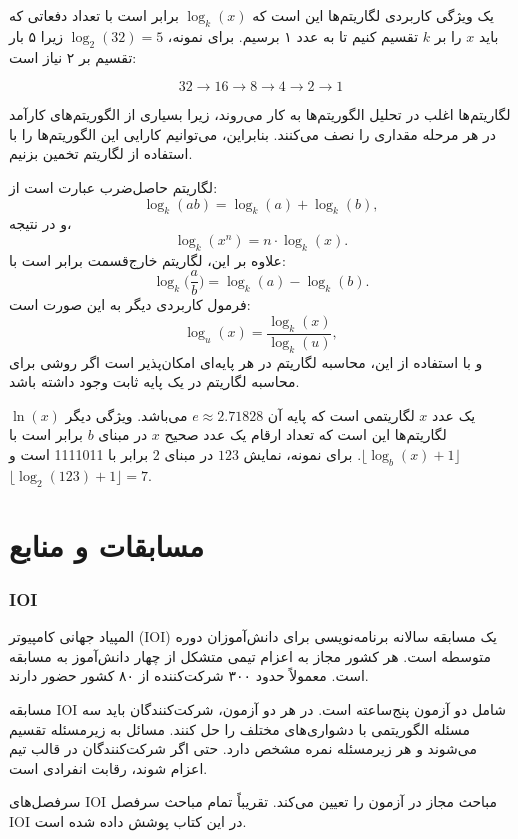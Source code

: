 یک ویژگی کاربردی لگاریتم‌ها این است
که $\log_k(x)$ برابر است با تعداد دفعاتی که
باید $x$ را بر $k$ تقسیم کنیم تا به
عدد ۱ برسیم.
برای نمونه، $\log_2(32)=5$
زیرا ۵ بار تقسیم بر ۲ نیاز است:

\[32 \rightarrow 16 \rightarrow 8 \rightarrow 4 \rightarrow 2 \rightarrow 1 \]

لگاریتم‌ها اغلب در تحلیل
الگوریتم‌ها به کار می‌روند، زیرا بسیاری از الگوریتم‌های کارآمد
در هر مرحله مقداری را نصف می‌کنند.
بنابراین، می‌توانیم کارایی این الگوریتم‌ها را
با استفاده از لگاریتم تخمین بزنیم.

لگاریتم حاصل‌ضرب عبارت است از:
\[\log_k(ab) = \log_k(a)+\log_k(b),\]
و در نتیجه،
\[\log_k(x^n) = n \cdot \log_k(x).\]
علاوه بر این، لگاریتم خارج‌قسمت برابر است با:
\[\log_k\Big(\frac{a}{b}\Big) = \log_k(a)-\log_k(b).\]
فرمول کاربردی دیگر به این صورت است:
\[\log_u(x) = \frac{\log_k(x)}{\log_k(u)},\]
و با استفاده از این، محاسبه
لگاریتم در هر پایه‌ای امکان‌پذیر است اگر روشی برای
محاسبه لگاریتم در یک پایه ثابت وجود داشته باشد.


 $\ln(x)$ یک عدد $x$
لگاریتمی است که پایه آن $e \approx 2.71828$ می‌باشد.
ویژگی دیگر لگاریتم‌ها این است که
تعداد ارقام یک عدد صحیح $x$ در مبنای $b$ برابر است با
$\lfloor \log_b(x)+1 \rfloor$.
برای نمونه، نمایش
$123$ در مبنای $2$ برابر با 1111011 است و
$\lfloor \log_2(123)+1 \rfloor = 7$.

\section{مسابقات و منابع}

\subsubsection{IOI}

المپیاد جهانی کامپیوتر (IOI)
یک مسابقه سالانه برنامه‌نویسی برای
دانش‌آموزان دوره متوسطه است.
هر کشور مجاز به اعزام تیمی متشکل از
چهار دانش‌آموز به مسابقه است.
معمولاً حدود ۳۰۰ شرکت‌کننده
از ۸۰ کشور حضور دارند.

مسابقه IOI شامل دو آزمون پنج‌ساعته است.
در هر دو آزمون، شرکت‌کنندگان باید سه مسئله الگوریتمی با دشواری‌های مختلف را حل کنند.
مسائل به زیرمسئله تقسیم می‌شوند و هر زیرمسئله نمره مشخص دارد.
حتی اگر شرکت‌کنندگان در قالب تیم اعزام شوند، رقابت انفرادی است.

سرفصل‌های IOI \cite{iois} مباحث مجاز در آزمون را تعیین می‌کند.
تقریباً تمام مباحث سرفصل IOI در این کتاب پوشش داده شده است.

